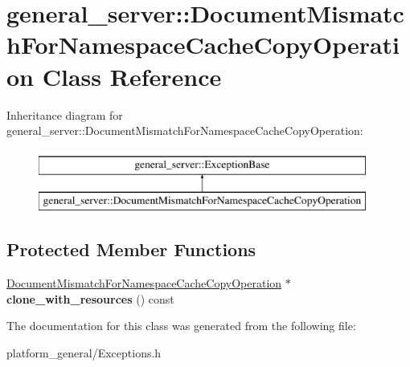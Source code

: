 \hypertarget{classgeneral__server_1_1DocumentMismatchForNamespaceCacheCopyOperation}{\section{general\-\_\-server\-:\-:\-Document\-Mismatch\-For\-Namespace\-Cache\-Copy\-Operation \-Class \-Reference}
\label{classgeneral__server_1_1DocumentMismatchForNamespaceCacheCopyOperation}
}
\-Inheritance diagram for general\-\_\-server\-:\-:\-Document\-Mismatch\-For\-Namespace\-Cache\-Copy\-Operation\-:\begin{figure}[H]
\begin{center}
\leavevmode
\includegraphics[height=2.000000cm]{classgeneral__server_1_1DocumentMismatchForNamespaceCacheCopyOperation}
\end{center}
\end{figure}
\subsection*{\-Protected \-Member \-Functions}
\begin{DoxyCompactItemize}
\item 
\hypertarget{classgeneral__server_1_1DocumentMismatchForNamespaceCacheCopyOperation_a5f27b2b65e39f85a5e51ad2f761f5d01}{\hyperlink{classgeneral__server_1_1DocumentMismatchForNamespaceCacheCopyOperation}{\-Document\-Mismatch\-For\-Namespace\-Cache\-Copy\-Operation} $\ast$ {\bfseries clone\-\_\-with\-\_\-resources} () const }\label{classgeneral__server_1_1DocumentMismatchForNamespaceCacheCopyOperation_a5f27b2b65e39f85a5e51ad2f761f5d01}

\end{DoxyCompactItemize}


\-The documentation for this class was generated from the following file\-:\begin{DoxyCompactItemize}
\item 
platform\-\_\-general/\-Exceptions.\-h\end{DoxyCompactItemize}
